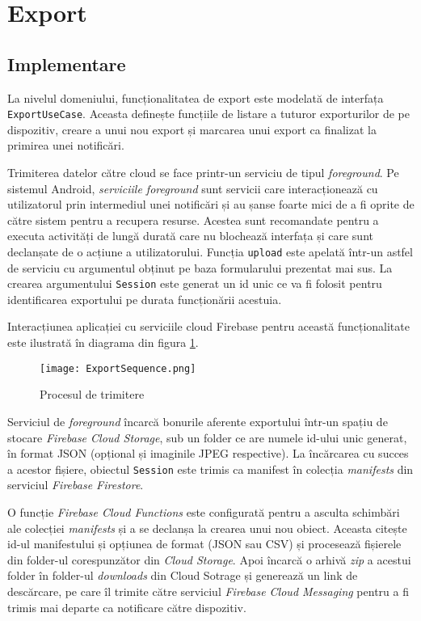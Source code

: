 \section{Export}

\subsection{Implementare}

La nivelul domeniului, funcționalitatea de export este modelată de interfața \texttt{ExportUseCase}. Aceasta definește funcțiile de listare a tuturor exporturilor de pe dispozitiv, creare a unui nou export și marcarea unui export ca finalizat la primirea unei notificări.



Trimiterea datelor către cloud se face printr-un serviciu de tipul \emph{foreground}. Pe sistemul Android, \emph{serviciile foreground} sunt servicii care interacționează cu utilizatorul prin intermediul unei notificări și au șanse foarte mici de a fi oprite de către sistem pentru a recupera resurse. Acestea sunt recomandate pentru a executa activități de lungă durată care nu blochează interfața și care sunt declanșate de o acțiune a utilizatorului. Funcția \texttt{upload} este apelată într-un astfel de serviciu cu argumentul obținut pe baza formularului prezentat mai sus. La crearea argumentului \texttt{Session} este generat un id unic ce va fi folosit pentru identificarea exportului pe durata funcționării acestuia.

Interacțiunea aplicației cu serviciile cloud Firebase pentru această funcționalitate este ilustrată în diagrama din figura \ref{exportProcess}.

\begin{figure}[ht]
  \centering
  \texttt{[image: ExportSequence.png]}
  \caption{Procesul de trimitere}
  \label{exportProcess}
\end{figure}

Serviciul de \emph{foreground} încarcă bonurile aferente exportului într-un spațiu de stocare \emph{Firebase Cloud Storage}, sub un folder ce are numele id-ului unic generat, în format JSON (opțional și imaginile JPEG respective). La încărcarea cu succes a acestor fișiere, obiectul \texttt{Session} este trimis ca manifest în colecția \emph{manifests} din serviciul \emph{Firebase Firestore}.

O funcție \emph{Firebase Cloud Functions} este configurată pentru a asculta schimbări ale colecției \emph{manifests} și a se declanșa la crearea unui nou obiect. Aceasta citește id-ul manifestului și opțiunea de format (JSON sau CSV) și procesează fișierele din folder-ul corespunzător din \emph{Cloud Storage}. Apoi încarcă o arhivă \emph{zip} a acestui folder în folder-ul \emph{downloads} din Cloud Sotrage și generează un link de descărcare, pe care îl trimite către serviciul \emph{Firebase Cloud Messaging} pentru a fi trimis mai departe ca notificare către dispozitiv.

